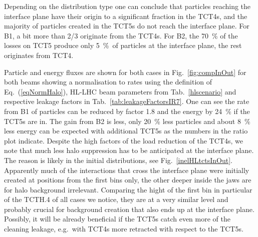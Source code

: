 Depending on the distribution type one can conclude that particles reaching the interface plane have their origin to a significant fraction in the TCT4s, and the majority of particles created in the TCT5s do not reach the interface plane. For B1, a bit more than 2/3 originate from the TCT4s. For B2, the 70~\% of the losses on TCT5 produce only 5~\%~of particles at the interface plane, the rest originates from TCT4. 

Particle and energy fluxes are shown for both cases in Fig.~\ref{fig:compInOut} for both beams showing a normalisation to rates using the definition of Eq.~(\ref{eqNormHalo}), HL-LHC beam parameters from Tab.~\ref{hlscenario} and respective leakage factors in Tab.~\ref{tab:leakageFactorsIR7}. One can see the rate from B1 of particles can be reduced by factor 1.8 and the energy by 24~\% if the TCT5s are in. The gain from B2 is less, only 20~\% less particles and about 8~\% less energy can be expected with additional TCT5s as the numbers in the ratio plot indicate. Despite the high factors of the load reduction of the TCT4s, we note that much less halo suppression has to be anticipated at the interface plane. The reason is likely in the initial distributions, see Fig.~\ref{inelHLtctsInOut}. Apparently much of the interactions that cross the interface plane were initially created at positions from the first bins only, the other deeper inside the jaws are for halo background irrelevant. Comparing the hight of the first bin in particular of the TCTH.4 of all cases we notice, they are at a very similar level and probably crucial for background creation that also ends up at the interface plane. Possibly, it will be already beneficial if the TCT5s catch even more of the cleaning leakage, e.g.~with TCT4s more retracted with respect to the TCT5s.




